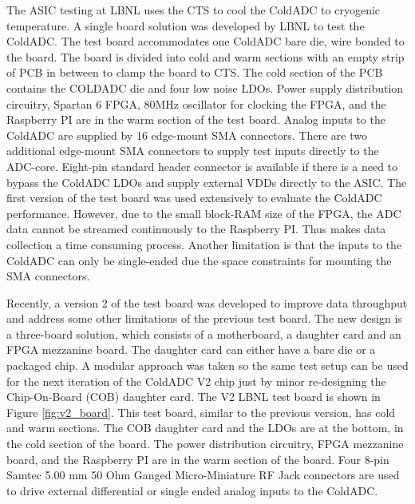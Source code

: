 \label{sec:2.4}
\clearpage
The ASIC testing at LBNL uses the CTS to cool the ColdADC to cryogenic temperature. A single board solution was 
developed by LBNL to test the ColdADC. The test board accommodates one ColdADC bare die, wire bonded to the board. 
The board is divided into cold and warm sections with an empty strip of PCB in between to clamp the board to CTS.
The cold section of the PCB contains the COLDADC die and four low noise LDOs.
Power supply distribution circuitry, Spartan 6 FPGA,  80MHz oscillator for clocking 
the FPGA, and the Raspberry PI are in the warm section of the test board. Analog inputs to 
the ColdADC are supplied by 16 edge-mount SMA connectors. There are two additional edge-mount SMA connectors 
to supply test inputs directly to the ADC-core. Eight-pin standard header connector is available if there is 
a need to bypass the ColdADC LDOs and supply external VDDs directly to the ASIC.
The first version of the test board was used extensively to evaluate the ColdADC performance.  However, due to the small 
block-RAM size of the FPGA, the ADC data cannot be streamed continuously to the Raspberry PI. Thus makes
data collection a time consuming process. Another limitation is that the inputs to the ColdADC can only be single-ended due 
the space constraints for mounting the SMA connectors.

Recently, a version 2 of the test board was developed to improve data throughput and address some other limitations 
of the previous test board.  The new design is a three-board 
solution, which consists of a motherboard, a daughter card and an FPGA mezzanine board. The daughter card can either have a 
bare die or a packaged chip. A modular approach was taken so the same test setup 
can be used for the next iteration of the ColdADC V2 chip just by minor re-designing the Chip-On-Board (COB) daughter card. The V2 LBNL 
test board is shown in Figure \ref{fig:v2_board}. This test board, similar to the previous version, has cold and warm 
sections. The COB daughter card and the LDOs are at the bottom, in the cold section of the board. The power 
distribution circuitry, FPGA mezzanine board, and the Raspberry PI are in the warm section of the board. 
Four 8-pin Samtec 5.00 mm 50 Ohm Ganged Micro-Miniature RF Jack connectors are used to drive external 
differential or single ended analog inputs to the ColdADC.  

